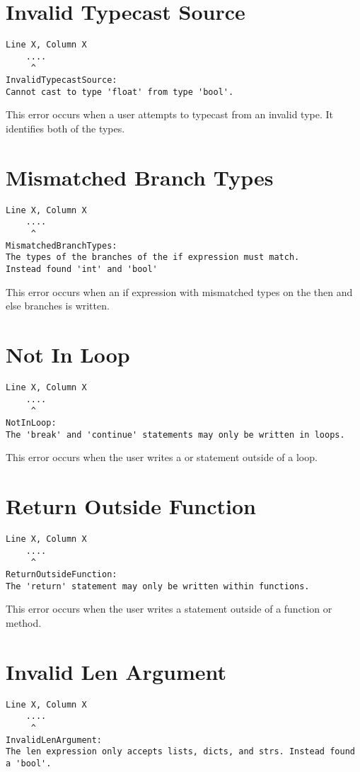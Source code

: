 \section{Invalid Typecast Source}
\begin{lstlisting}[breaklines]
Line X, Column X
    ....
     ^
InvalidTypecastSource:
Cannot cast to type 'float' from type 'bool'.
\end{lstlisting}

This error occurs when a user attempts to typecast from an invalid type. It identifies
both of the types.


\section{Mismatched Branch Types}
\begin{lstlisting}[breaklines]
Line X, Column X
    ....
     ^
MismatchedBranchTypes:
The types of the branches of the if expression must match.
Instead found 'int' and 'bool'
\end{lstlisting}

This error occurs when an if expression with mismatched types on the then and
else branches is written.

\section{Not In Loop}
\begin{lstlisting}[breaklines]
Line X, Column X
    ....
     ^
NotInLoop:
The 'break' and 'continue' statements may only be written in loops.
\end{lstlisting}

This error occurs when the user writes a  or  statement
outside of a loop.

\section{Return Outside Function}
\begin{lstlisting}[breaklines]
Line X, Column X
    ....
     ^
ReturnOutsideFunction:
The 'return' statement may only be written within functions.
\end{lstlisting}

This error occurs when the user writes a  statement outside of a function or method.

\section{Invalid Len Argument}
\begin{lstlisting}[breaklines]
Line X, Column X
    ....
     ^
InvalidLenArgument:
The len expression only accepts lists, dicts, and strs. Instead found a 'bool'.
\end{lstlisting}

